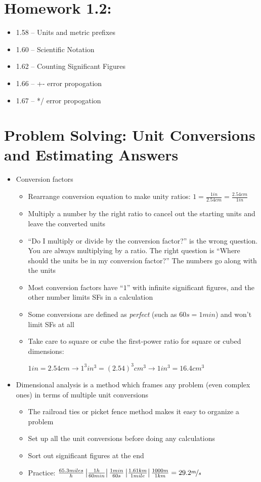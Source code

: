 \documentclass[12pt, openany, letterpaper]{memoir}
\begin{document}
\section*{Homework 1.2:}
\begin{itemize}
	\item 1.58 -- Units and metric prefixes
	\item 1.60 -- Scientific Notation
	\item 1.62 -- Counting Significant Figures
	\item 1.66 -- +- error propogation
	\item 1.67 -- */ error propogation
\end{itemize}

\section{Problem Solving: Unit Conversions and Estimating Answers}
\begin{itemize}
	\item Conversion factors
	      \begin{itemize}
		      \item Rearrange conversion equation to make unity ratios: $1=\frac{1in}{2.54cm}=\frac{2.54cm}{1in}$
		      \item Multiply a number by the right ratio to cancel out the starting units and leave the converted units
		      \item ``Do I multiply or divide by the conversion factor?'' is the wrong question. You are always multiplying by a ratio. The right question is ``Where should the units be in my conversion factor?'' The numbers go along with the units
		      \item Most conversion factors have ``$1$'' with infinite significant figures, and the other number limits SFs in a calculation
		      \item Some conversions are defined as \emph{perfect} (such as $60s=1min$) and won't limit SFs at all
		      \item Take care to square or cube the first-power ratio for square or cubed dimensions:

		            $1in=2.54cm\rightarrow1^3in^3=\left(2.54\right)^3cm^3\rightarrow 1in^3=16.4cm^3$
	      \end{itemize}
	\item Dimensional analysis is a method which frames any problem (even complex ones) in terms of multiple unit conversions
	      \begin{itemize}
		      \item The railroad ties or picket fence method makes it easy to organize a problem
		      \item Set up all the unit conversions before doing any calculations
		      \item Sort out significant figures at the end
		      \item Practice: $\frac{65.3miles}{h}\left|\frac{1h}{60min}\right|\frac{1min}{60s}\left|\frac{1.61km}{1mile}\right|\frac{1000m}{1km}=29.2\nicefrac{m}{s}$
	      \end{itemize}
\end{itemize}
\end{document}
